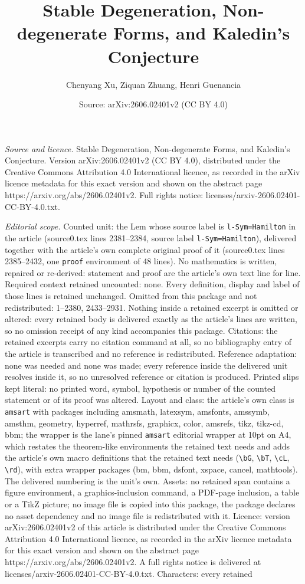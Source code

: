 \documentclass[10pt,a4paper]{amsart}
\title[Stable Degeneration, Non-degenerate Forms, and Kaledin's Con]{Stable Degeneration, Non-degenerate Forms, and Kaledin's Conjecture}
\author{Chenyang Xu, Ziquan Zhuang, Henri Guenancia}
\date{Source: arXiv:2606.02401v2 (CC BY 4.0)}
\begin{document}
\maketitle

\noindent\emph{Source and licence.} Stable Degeneration, Non-degenerate Forms, and Kaledin's Conjecture. Version arXiv:2606.02401v2 (CC BY 4.0), distributed under the Creative Commons Attribution 4.0 International licence, as recorded in the arXiv licence metadata for this exact version and shown on the abstract page https://arxiv.org/abs/2606.02401v2. Full rights notice: licenses/arxiv-2606.02401-CC-BY-4.0.txt.\par\smallskip

\noindent\textit{Editorial scope.} Counted unit: the Lem whose source label is \texttt{l-Sym=Hamilton} in the article (source0.tex lines 2381--2384, source label \texttt{l-Sym=Hamilton}), delivered together with the article's own complete original proof of it (source0.tex lines 2385--2432, one \texttt{proof} environment of 48 lines). No mathematics is written, repaired or re-derived: statement and proof are the article's own text line for line. Required context retained uncounted: none. Every definition, display and label of those lines is retained unchanged. Omitted from this package and not redistributed: 1--2380, 2433--2931. Nothing inside a retained excerpt is omitted or altered: every retained body is delivered exactly as the article's lines are written, so no omission receipt of any kind accompanies this package. Citations: the retained excerpts carry no citation command at all, so no bibliography entry of the article is transcribed and no reference is redistributed. Reference adaptation: none was needed and none was made; every reference inside the delivered unit resolves inside it, so no unresolved reference or citation is produced. Printed slips kept literal: no printed word, symbol, hypothesis or number of the counted statement or of its proof was altered. Layout and class: the article's own class is \texttt{amsart} with packages including amsmath, latexsym, amsfonts, amssymb, amsthm, geometry, hyperref, mathrsfs, graphicx, color, amsrefs, tikz, tikz-cd, bbm; the wrapper is the lane's pinned \texttt{amsart} editorial wrapper at 10pt on A4, which restates the theorem-like environments the retained text needs and adds the article's own macro definitions that the retained text needs (\texttt{\textbackslash bG}, \texttt{\textbackslash bT}, \texttt{\textbackslash cL}, \texttt{\textbackslash rd}), with extra wrapper packages (bm, bbm, dsfont, xspace, cancel, mathtools). The delivered numbering is the unit's own. Assets: no retained span contains a figure environment, a graphics-inclusion command, a PDF-page inclusion, a table or a TikZ picture; no image file is copied into this package, the package declares no asset dependency and no image file is redistributed with it. Licence: version arXiv:2606.02401v2 of this article is distributed under the Creative Commons Attribution 4.0 International licence, as recorded in the arXiv licence metadata for this exact version and shown on the abstract page https://arxiv.org/abs/2606.02401v2. A full rights notice is delivered at licenses/arxiv-2606.02401-CC-BY-4.0.txt. Characters: every retained 
\end{document}
